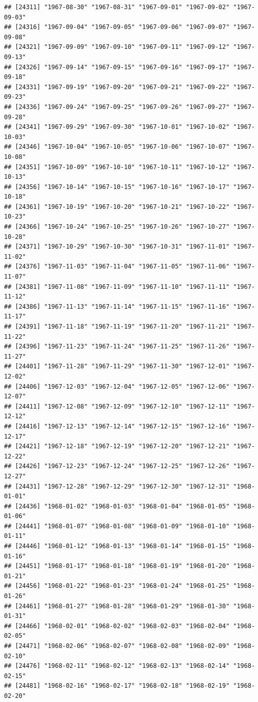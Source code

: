 \documentclass{article}\usepackage[]{graphicx}\usepackage[]{color}
\makeatletter
\newenvironment{kframe}{%
 \def\at@end@of@kframe{}%
 \ifinner\ifhmode%
  \def\at@end@of@kframe{\end{minipage}}%
  \begin{minipage}{\columnwidth}%
 \fi\fi%
 \def\FrameCommand##1{\hskip\@totalleftmargin \hskip-\fboxsep
 \colorbox{shadecolor}{##1}\hskip-\fboxsep
     \hskip-\linewidth \hskip-\@totalleftmargin \hskip\columnwidth}%
 \MakeFramed {\advance\hsize-\width
   \@totalleftmargin\z@ \linewidth\hsize
   \@setminipage}}%
 {\par\unskip\endMakeFramed%
 \at@end@of@kframe}
\newenvironment{knitrout}{}{} %
\makeatother
\begin{document}
\begin{description}
\begin{knitrout}
\begin{kframe}
\begin{verbatim}
## [24311] "1967-08-30" "1967-08-31" "1967-09-01" "1967-09-02" "1967-09-03"
## [24316] "1967-09-04" "1967-09-05" "1967-09-06" "1967-09-07" "1967-09-08"
## [24321] "1967-09-09" "1967-09-10" "1967-09-11" "1967-09-12" "1967-09-13"
## [24326] "1967-09-14" "1967-09-15" "1967-09-16" "1967-09-17" "1967-09-18"
## [24331] "1967-09-19" "1967-09-20" "1967-09-21" "1967-09-22" "1967-09-23"
## [24336] "1967-09-24" "1967-09-25" "1967-09-26" "1967-09-27" "1967-09-28"
## [24341] "1967-09-29" "1967-09-30" "1967-10-01" "1967-10-02" "1967-10-03"
## [24346] "1967-10-04" "1967-10-05" "1967-10-06" "1967-10-07" "1967-10-08"
## [24351] "1967-10-09" "1967-10-10" "1967-10-11" "1967-10-12" "1967-10-13"
## [24356] "1967-10-14" "1967-10-15" "1967-10-16" "1967-10-17" "1967-10-18"
## [24361] "1967-10-19" "1967-10-20" "1967-10-21" "1967-10-22" "1967-10-23"
## [24366] "1967-10-24" "1967-10-25" "1967-10-26" "1967-10-27" "1967-10-28"
## [24371] "1967-10-29" "1967-10-30" "1967-10-31" "1967-11-01" "1967-11-02"
## [24376] "1967-11-03" "1967-11-04" "1967-11-05" "1967-11-06" "1967-11-07"
## [24381] "1967-11-08" "1967-11-09" "1967-11-10" "1967-11-11" "1967-11-12"
## [24386] "1967-11-13" "1967-11-14" "1967-11-15" "1967-11-16" "1967-11-17"
## [24391] "1967-11-18" "1967-11-19" "1967-11-20" "1967-11-21" "1967-11-22"
## [24396] "1967-11-23" "1967-11-24" "1967-11-25" "1967-11-26" "1967-11-27"
## [24401] "1967-11-28" "1967-11-29" "1967-11-30" "1967-12-01" "1967-12-02"
## [24406] "1967-12-03" "1967-12-04" "1967-12-05" "1967-12-06" "1967-12-07"
## [24411] "1967-12-08" "1967-12-09" "1967-12-10" "1967-12-11" "1967-12-12"
## [24416] "1967-12-13" "1967-12-14" "1967-12-15" "1967-12-16" "1967-12-17"
## [24421] "1967-12-18" "1967-12-19" "1967-12-20" "1967-12-21" "1967-12-22"
## [24426] "1967-12-23" "1967-12-24" "1967-12-25" "1967-12-26" "1967-12-27"
## [24431] "1967-12-28" "1967-12-29" "1967-12-30" "1967-12-31" "1968-01-01"
## [24436] "1968-01-02" "1968-01-03" "1968-01-04" "1968-01-05" "1968-01-06"
## [24441] "1968-01-07" "1968-01-08" "1968-01-09" "1968-01-10" "1968-01-11"
## [24446] "1968-01-12" "1968-01-13" "1968-01-14" "1968-01-15" "1968-01-16"
## [24451] "1968-01-17" "1968-01-18" "1968-01-19" "1968-01-20" "1968-01-21"
## [24456] "1968-01-22" "1968-01-23" "1968-01-24" "1968-01-25" "1968-01-26"
## [24461] "1968-01-27" "1968-01-28" "1968-01-29" "1968-01-30" "1968-01-31"
## [24466] "1968-02-01" "1968-02-02" "1968-02-03" "1968-02-04" "1968-02-05"
## [24471] "1968-02-06" "1968-02-07" "1968-02-08" "1968-02-09" "1968-02-10"
## [24476] "1968-02-11" "1968-02-12" "1968-02-13" "1968-02-14" "1968-02-15"
## [24481] "1968-02-16" "1968-02-17" "1968-02-18" "1968-02-19" "1968-02-20"

\end{verbatim}
\end{kframe}
\end{knitrout}
\end{description}
\end{document}

